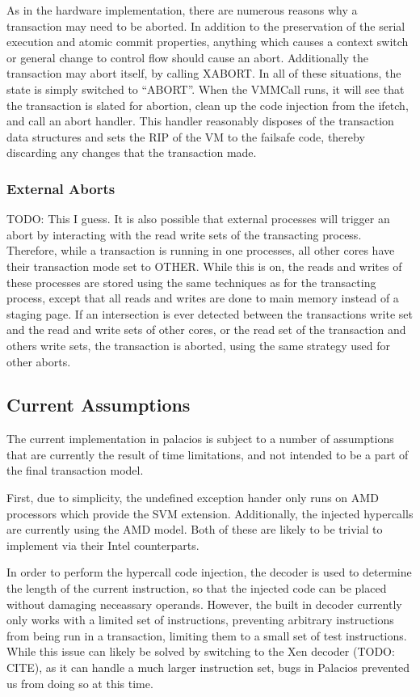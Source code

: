 \documentclass{acm_proc_article-sp}
\begin{document}
As in the hardware implementation, there are numerous reasons why a transaction
may need to be aborted. In addition to the preservation of the serial execution
and atomic commit properties, anything which causes a context switch or general
change to control flow should cause an abort. Additionally the transaction may
abort itself, by calling XABORT. In all of these situations, the state is 
simply switched to ``ABORT''. When the VMMCall runs, it will see that the 
transaction is slated for abortion, clean up the code injection from the ifetch,
and call an abort handler. This handler reasonably disposes of the transaction
data structures and sets the RIP of the VM to the failsafe code, thereby
discarding any changes that the transaction made. 

\subsubsection{External Aborts}

TODO: This I guess.
It is also possible that external processes will trigger an abort by 
interacting with the read write sets of the transacting process. Therefore, 
while a transaction is running in one processes, all other cores have their
transaction mode set to OTHER. While this is on, the reads and writes of 
these processes are stored using the same techniques as for the transacting
process, except that all reads and writes are done to main memory instead of a 
staging page. If an intersection is ever detected between the transactions
write set and the read and write sets of other cores, or the read set of the
transaction and others write sets, the transaction is aborted, using the same
strategy used for other aborts.  

\subsection{Current Assumptions}

The current implementation in palacios is subject to a number of assumptions
that are currently the result of time limitations, and not intended to be a
part of the final transaction model.

First, due to simplicity, the undefined exception hander only runs on AMD 
processors which provide the SVM extension. Additionally, the injected 
hypercalls are currently using the AMD model. Both of these are likely to be
trivial to implement via their Intel counterparts.  

In order to perform the hypercall code injection, the decoder is used to 
determine the length of the current instruction, so that the injected code
can be placed without damaging neceassary operands. However, the built in
decoder currently only works with a limited set of instructions, preventing
arbitrary instructions from being run in a transaction, limiting them to a 
small set of test instructions. While this issue can likely be solved by 
switching to the Xen decoder (TODO: CITE), as it can handle a much larger
instruction set, bugs in Palacios prevented us from doing so at this time.
\end{document}
